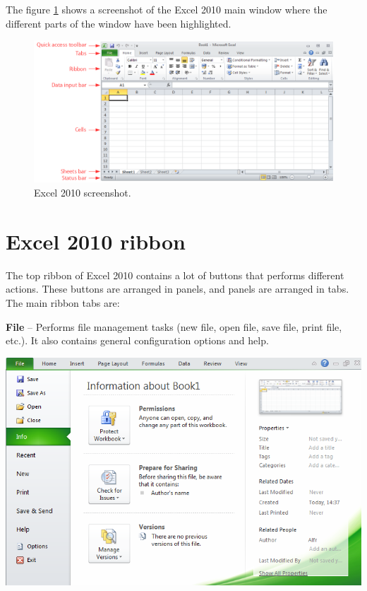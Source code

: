 The figure \ref{img-excel_2010_screenshot} shows a screenshot of the Excel 2010 main window where the different parts of
the window have been highlighted.

\begin{figure}[htbp]
\begin{center}
\includegraphics[max width=\linewidth]{../img/excel_2010_screenshot.png}
\end{center}
\caption{Excel 2010 screenshot.}
\label{img-excel_2010_screenshot}
\end{figure}

\section{Excel 2010 ribbon}\hypertarget{excel-2010-ribbon}{}\label{excel-2010-ribbon}

The top ribbon of Excel 2010 contains a lot of buttons that performs different actions. These buttons are arranged in panels, and panels are arranged in tabs. The main ribbon tabs are:

\textbf{File} – Performs file management tasks (new file, open file, save file, print file, etc.). It also contains general configuration options and help.

\begin{center}
\includegraphics[max width=\linewidth]{../img/excel_2010_file_ribbon.png}
\end{center}

